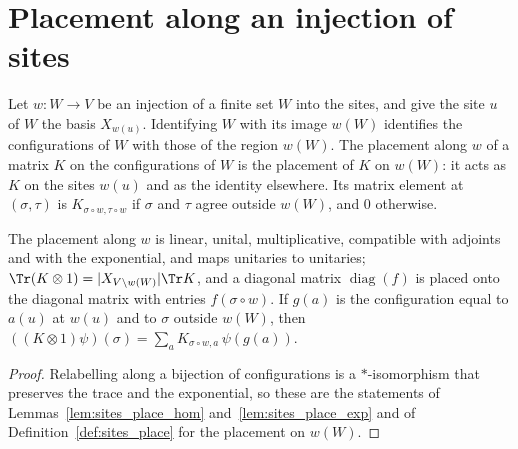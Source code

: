 \section{Placement along an injection of sites}
\label{sec:sites_place_along}

\begin{definition}
    \label{def:sites_place_along}
    \leanok
    Let $w\colon W\to V$ be an injection of a finite set $W$ into the sites, and give the
    site $u$ of $W$ the basis $X_{w(u)}$. Identifying $W$ with its image $w(W)$
    identifies the configurations of $W$ with those of the region $w(W)$. The placement
    along $w$ of a matrix $K$ on the configurations of $W$ is the placement of $K$ on
    $w(W)$: it acts as $K$ on the sites $w(u)$ and as the identity elsewhere. Its matrix
    element at $(\sigma,\tau)$ is $K_{\sigma\circ w,\tau\circ w}$ if $\sigma$ and $\tau$
    agree outside $w(W)$, and $0$ otherwise.
\end{definition}

\begin{lemma}
    \label{lem:sites_place_along_hom}
    \leanok
    The placement along $w$ is linear, unital, multiplicative, compatible with adjoints and
    with the exponential, and maps unitaries to unitaries;
    $\Tr(K\otimes1)=\lvert X_{V\setminus w(W)}\rvert\Tr K$, and a diagonal matrix
    $\operatorname{diag}(f)$ is placed onto the diagonal matrix with entries
    $f(\sigma\circ w)$. If $g(a)$ is the configuration equal to $a(u)$ at $w(u)$ and to
    $\sigma$ outside $w(W)$, then $((K\otimes1)\psi)(\sigma)=\sum_aK_{\sigma\circ w,a}\,
    \psi(g(a))$.
\end{lemma}
\begin{proof}\leanok
    Relabelling along a bijection of configurations is a $*$-isomorphism that preserves
    the trace and the exponential, so these are the statements of
    Lemmas~\ref{lem:sites_place_hom} and~\ref{lem:sites_place_exp} and of
    Definition~\ref{def:sites_place} for the placement on $w(W)$.
\end{proof}

